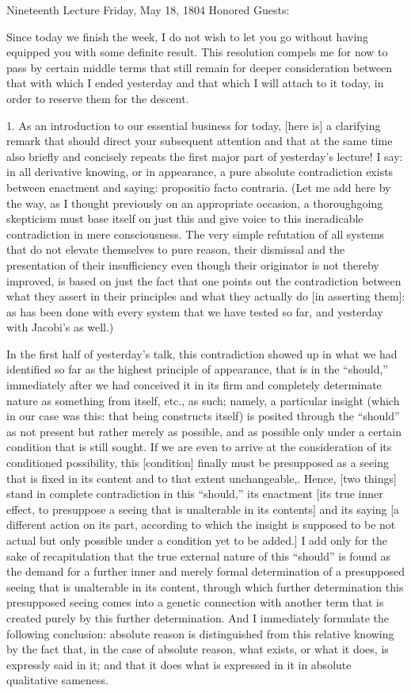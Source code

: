 Nineteenth Lecture
Friday, May 18, 1804
Honored Guests:

Since today we finish the week,
I do not wish to let you go without
having equipped you with some definite result.
This resolution compels me for now to pass by
certain middle terms that still remain
for deeper consideration between
that with which I ended yesterday
and that which I will attach to it today,
in order to reserve them for the descent.

1. As an introduction to our essential business for today,
[here is] a clarifying remark that
should direct your subsequent attention
and that at the same time also briefly and concisely
repeats the first major part of yesterday's lecture!
I say: in all derivative knowing, or in appearance,
a pure absolute contradiction exists
between enactment and saying:
propositio facto contraria.
(Let me add here by the way,
as I thought previously on an appropriate occasion,
a thoroughgoing skepticism must base itself on just this
and give voice to this ineradicable
contradiction in mere consciousness.
The very simple refutation of all systems
that do not elevate themselves to pure reason,
their dismissal and the presentation of their insufficiency
even though their originator is not thereby improved,
is based on just the fact that one points out
the contradiction between what they assert in their principles
and what they actually do [in asserting them]:
as has been done with every system that we have tested so far,
and yesterday with Jacobi's as well.)

In the first half of yesterday's talk,
this contradiction showed up
in what we had identified so far as
the highest principle of appearance,
that is in the “should,”
immediately after we had conceived it
in its firm and completely determinate nature
as something from itself, etc., as such;
namely, a particular insight
(which in our case was this:
that being constructs itself)
is posited through the “should”
as not present but rather merely as possible,
and as possible only under a certain condition
that is still sought.
If we are even to arrive at the consideration of
its conditioned possibility,
this [condition] finally must be presupposed as
a seeing that is fixed in its content
and to that extent unchangeable,.
Hence, [two things] stand in
complete contradiction in this “should,”
its enactment [its true inner effect,
to presuppose a seeing that is unalterable in its contents]
and its saying [a different action on its part,
according to which the insight is supposed
to be not actual but only possible
under a condition yet to be added.]
I add only for the sake of recapitulation
that the true external nature of this “should” is
found as the demand for a further inner
and merely formal determination
of a presupposed seeing that is
unalterable in its content,
through which further determination
this presupposed seeing comes into
a genetic connection with another term
that is created purely by this further determination.
And I immediately formulate the following conclusion:
absolute reason is distinguished from this relative knowing
by the fact that, in the case of absolute reason,
what exists, or what it does, is expressly said in it;
and that it does what is expressed in it
in absolute qualitative sameness.

